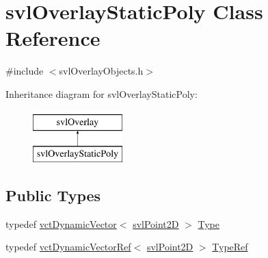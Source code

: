 \hypertarget{classsvl_overlay_static_poly}{}\section{svl\+Overlay\+Static\+Poly Class Reference}
\label{classsvl_overlay_static_poly}


{\ttfamily \#include $<$svl\+Overlay\+Objects.\+h$>$}

Inheritance diagram for svl\+Overlay\+Static\+Poly\+:\begin{figure}[H]
\begin{center}
\leavevmode
\includegraphics[height=2.000000cm]{d4/da0/classsvl_overlay_static_poly}
\end{center}
\end{figure}
\subsection*{Public Types}
\begin{DoxyCompactItemize}
\item 
typedef \hyperlink{classvct_dynamic_vector}{vct\+Dynamic\+Vector}$<$ \hyperlink{structsvl_point2_d}{svl\+Point2\+D} $>$ \hyperlink{classsvl_overlay_static_poly_a0c7018bd6af72d2fba86b58f1d966291}{Type}
\item 
typedef \hyperlink{classvct_dynamic_vector_ref}{vct\+Dynamic\+Vector\+Ref}$<$ \hyperlink{structsvl_point2_d}{svl\+Point2\+D} $>$ \hyperlink{classsvl_overlay_static_poly_a2d317856c0cec72b3a76252446a85944}{Type\+Ref}
\end{DoxyCompactItemize}
